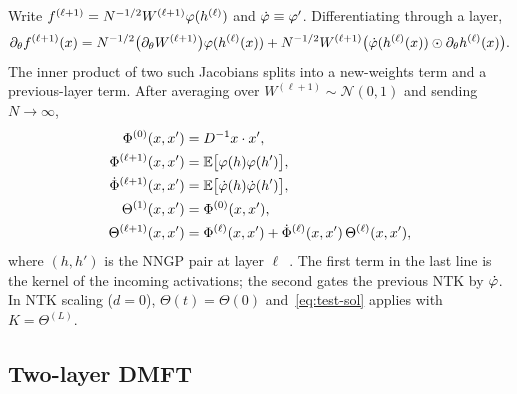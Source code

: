 Write $f^{(\ell+1)}=N^{-1/2}W^{(\ell+1)}\varphi(h^{(\ell)})$ and $\dot{\varphi}\equiv\varphi'$. Differentiating through a layer,
\begin{equation}
  \partial_\theta f^{(\ell+1)}(x)
  =N^{-1/2}\bigl(\partial_\theta W^{(\ell+1)}\bigr)\varphi(h^{(\ell)}(x))
  +N^{-1/2}W^{(\ell+1)}\bigl(\dot{\varphi}(h^{(\ell)}(x))\odot \partial_\theta h^{(\ell)}(x)\bigr).
  \label{eq:jac-layer}
\end{equation}
The inner product of two such Jacobians splits into a new-weights term and a previous-layer term. After averaging over $W^{(\ell+1)}\sim\mathcal{N}(0,1)$ and sending $N\to\infty$,
\begin{align}
  \Phi^{(0)}(x,x') &= D^{-1}x\cdot x', \nonumber\\
  \Phi^{(\ell+1)}(x,x') &= \mathbb{E}\bigl[\varphi(h)\varphi(h')\bigr], \nonumber\\
  \dot\Phi^{(\ell+1)}(x,x') &= \mathbb{E}\bigl[\dot{\varphi}(h)\dot{\varphi}(h')\bigr], \nonumber\\
  \Theta^{(1)}(x,x') &= \Phi^{(0)}(x,x'), \nonumber\\
  \Theta^{(\ell+1)}(x,x')
  &=
  \Phi^{(\ell)}(x,x')
  +\dot\Phi^{(\ell)}(x,x')\,\Theta^{(\ell)}(x,x'),
  \label{eq:ntk-rec}
\end{align}
where $(h,h')$ is the NNGP pair at layer $\ell$~\cite{pehlevan2023infinite}. The first term in the last line is the kernel of the incoming activations; the second gates the previous NTK by $\dot{\varphi}$. In NTK scaling ($d=0$), $\Theta(t)=\Theta(0)$ and~\eqref{eq:test-sol} applies with $K=\Theta^{(L)}$.

\subsection{Two-layer DMFT}

